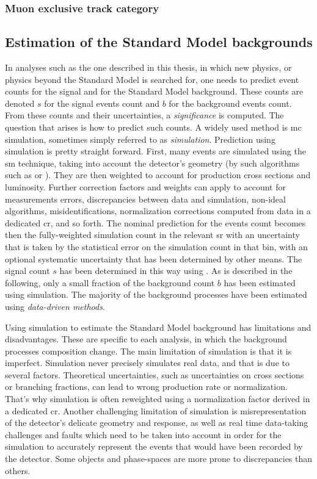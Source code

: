 
\subsubsection{Muon exclusive track category}

\clearpage
\subsection{Estimation of the Standard Model backgrounds}
\label{sec:background-estimation}

In analyses such as the one described in this thesis, in which new physics, or physics beyond the Standard Model is searched for, one needs to predict event counts for the signal and for the Standard Model background. These counts are denoted $s$ for the signal events count and $b$ for the background events count. From these counts and their uncertainties, a \emph{significance} is computed. The question that arises is how to predict such counts. A widely used method is \gls{mc} simulation, sometimes simply referred to as \emph{simulation}. Prediction using simulation is pretty straight forward. First, many events are simulated using the \gls{sm} technique, taking into account the detector's geometry (by such algorithms such as \FASTSIM or \FULLSIM). They are then weighted to account for production cross sections and luminosity. Further correction factors and weights can apply to account for measurements errors, discrepancies between data and simulation, non-ideal algorithms, misidentifications, normalization corrections computed from data in a dedicated \gls{cr}, and so forth. The nominal prediction for the events count becomes then the fully-weighted simulation count in the relevant \gls{sr} with an uncertainty that is taken by the statistical error on the simulation count in that bin, with an optional systematic uncertainty that has been determined by other means. The signal count $s$ has been determined in this way using \FASTSIM. As is described in the following, only a small fraction of the background count $b$ has been estimated using simulation. The majority of the background processes have been estimated using \emph{data-driven methods}.

Using simulation to estimate the Standard Model background has limitations and disadvantages. These are specific to each analysis, in which the background processes composition change. The main limitation of simulation is that it is imperfect. Simulation never precisely simulates real data, and that is due to several factors. Theoretical uncertainties, such as uncertainties on cross sections or branching fractions, can lead to wrong production rate or normalization. That's why simulation is often reweighted using a normalization factor derived in a dedicated \gls{cr}. Another challenging limitation of simulation is misrepresentation of the detector's delicate geometry and response, as well as real time data-taking challenges and faults which need to be taken into account in order for the simulation to accurately represent the events that would have been recorded by the detector. Some objects and phase-spaces are more prone to discrepancies than others.

